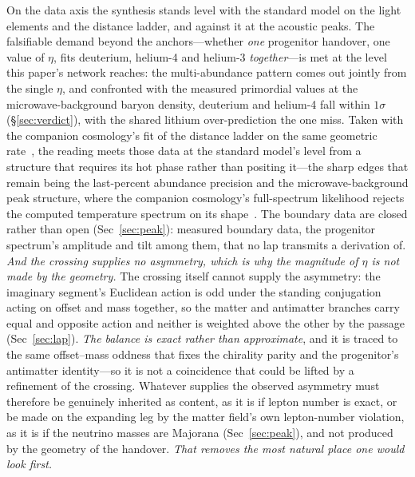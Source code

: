 \documentclass[11pt,a4paper]{article}
\theoremstyle{plain}
\theoremstyle{definition}
\theoremstyle{remark}
\begin{document}
On the data axis the synthesis stands level with the standard model on the light elements and the
distance ladder, and against it at the acoustic peaks. The falsifiable demand beyond the anchors---whether \emph{one} progenitor handover, one value of $\eta$, fits deuterium, helium-4 and helium-3 \emph{together}---is met at the level this paper's network reaches: the multi-abundance pattern comes out jointly from the single
$\eta$, and confronted with the measured primordial values at the microwave-background
baryon density, deuterium and helium-4 fall within $1\sigma$ (\S\ref{sec:verdict}), with the shared
lithium over-prediction the one miss. Taken with the companion cosmology's fit of the distance ladder on the same geometric
rate~\cite{JanzenCRcosmology}, the reading meets those data at the standard model's level from a structure
that requires its hot phase rather than positing it---the sharp edges that
remain being the last-percent abundance precision and the microwave-background peak structure, where the
companion cosmology's full-spectrum likelihood rejects the computed temperature spectrum on its
shape~\cite{JanzenCRcosmology}. The boundary data are closed rather than open (Sec~\ref{sec:peak}): measured
boundary data, the progenitor spectrum's amplitude and tilt among them, that no lap transmits a derivation of.
\emph{And the crossing supplies no asymmetry, which is why the magnitude of $\eta$ is not made by the
geometry.} The crossing itself
cannot supply the asymmetry: the imaginary segment's Euclidean action is odd under the standing conjugation
acting on offset and mass together, so the matter and antimatter branches carry equal and opposite action and
neither is weighted above the other by the passage (Sec~\ref{sec:lap}). \emph{The balance is exact rather than
approximate}, and it is traced to the same offset--mass oddness that fixes the chirality parity and the
progenitor's antimatter identity---so it is not a coincidence that could be lifted by a refinement of the
crossing. Whatever supplies the observed asymmetry must therefore be genuinely inherited as content, as it
is if lepton number is exact, or be made on the expanding leg by the matter field's own lepton-number
violation, as it is if the neutrino masses are Majorana (Sec~\ref{sec:peak}), and not produced by the
geometry of the handover. \emph{That removes the most natural place one would look first.}
\end{document}
